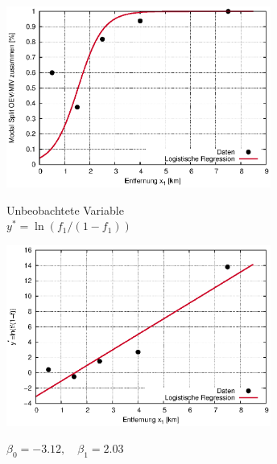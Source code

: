 \begin{landscape}
\begin{center}
{\begin{center}
\includegraphics[width=0.65\textwidth]{figsRegr/regr_logistic_WS1516cum_alt_f.eps}
\end{center}
}
\hspace{1em}
\parbox{0.65\textwidth}{
\begin{center}
{\small
Unbeobachtete Variable\\ $y^*=\ln(f_1/(1-f_1))$\\
}
\vspace{1em}

\includegraphics[width=0.65\textwidth]{figsRegr/regr_logistic_WS1516cum_alt.eps}
\end{center}
}

 {\small $ \beta_0=-3.12, \quad \beta_1=2.03 $}

\newpage

\vspace{0em}  



\end{center}
\end{landscape}
